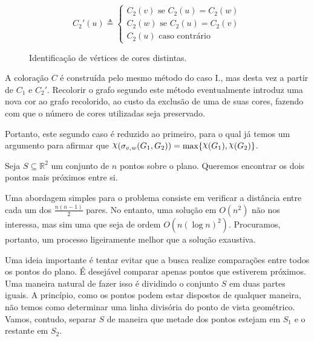 \documentclass{homework}
\begin{document}
\begin{enumerate}[label=\Roman*.]
		$$C_2'(u) \triangleq \begin{cases}
		C_2(v) \text{ se } C_2(u) = C_2(w)\\
		C_2(w) \text{ se } C_2(u) = C_2(v)\\
		C_2(u) \text{ caso contrário}
		\end{cases}$$
		
		\begin{figure}[H]
			\centering
			
			\caption{Identificação de vértices de cores distintas.}
			\label{fig:2.3}
		\end{figure}
		
		A coloração $C$ é construída pelo mesmo método do caso {I.}, mas desta vez a partir de $C_1$ e $C_2'$. Recolorir o grafo segundo este método eventualmente introduz uma nova cor ao grafo recolorido, ao custo da exclusão de uma de suas cores, fazendo com que o número de cores utilizadas seja preservado.\par
		
		Portanto, este segundo caso é reduzido ao primeiro, para o qual já temos um argumento para afirmar que $\rchi(\sigma_{v, w}(G_1, G_2)) = \max \{\rchi(G_1), \rchi(G_2)\}$. \par
		
	\end{enumerate}
	
	\quest Seja $S \subseteq \mathbb{R}^2$ um conjunto de $n$ pontos sobre o plano. Queremos encontrar os dois pontos mais próximos entre si. \par
	
	Uma abordagem simples para o problema consiste em verificar a distância entre cada um dos $\frac{n (n - 1)}{2}$ pares. No entanto, uma solução em $O(n^2)$ não nos interessa, mas sim uma que seja de ordem $O(n (\log n)^2)$. Procuramos, portanto, um processo ligeiramente melhor que a solução exaustiva. \par
	
	Uma ideia importante é tentar evitar que a busca realize comparações entre todos os pontos do plano. É desejável comparar apenas pontos que estiverem próximos. Uma maneira natural de fazer isso é dividindo o conjunto $S$ em duas partes iguais. A princípio, como os pontos podem estar dispostos de qualquer maneira, não temos como determinar uma linha divisória do ponto de vista geométrico. Vamos, contudo, separar $S$ de maneira que metade dos pontos estejam em $S_1$ e o restante em $S_2$. \par
	
\end{document}
